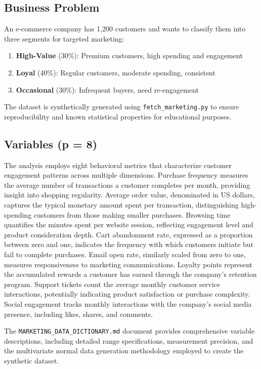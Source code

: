\documentclass[
]{article}
\begin{document}
\subsection{Business Problem}

An e-commerce company has 1,200 customers and wants to classify them
into three segments for targeted marketing:

\begin{enumerate}
\item
  \textbf{High-Value} (30\%): Premium customers, high spending and
  engagement
\item
  \textbf{Loyal} (40\%): Regular customers, moderate spending,
  consistent
\item
  \textbf{Occasional} (30\%): Infrequent buyers, need re-engagement
\end{enumerate}

The dataset is synthetically generated using
\texttt{fetch\_marketing.py} to ensure reproducibility and known
statistical properties for educational purposes.

\subsection{Variables (p = 8)}

The analysis employs eight behavioral metrics that characterize customer
engagement patterns across multiple dimensions. Purchase frequency
measures the average number of transactions a customer completes per
month, providing insight into shopping regularity. Average order value,
denominated in US dollars, captures the typical monetary amount spent
per transaction, distinguishing high-spending customers from those
making smaller purchases. Browsing time quantifies the minutes spent per
website session, reflecting engagement level and product consideration
depth. Cart abandonment rate, expressed as a proportion between zero and
one, indicates the frequency with which customers initiate but fail to
complete purchases. Email open rate, similarly scaled from zero to one,
measures responsiveness to marketing communications. Loyalty points
represent the accumulated rewards a customer has earned through the
company's retention program. Support tickets count the average monthly
customer service interactions, potentially indicating product
satisfaction or purchase complexity. Social engagement tracks monthly
interactions with the company's social media presence, including likes,
shares, and comments.

The \texttt{MARKETING\_DATA\_DICTIONARY.md} document provides
comprehensive variable descriptions, including detailed range
specifications, measurement precision, and the multivariate normal data
generation methodology employed to create the synthetic dataset.
\end{document}
